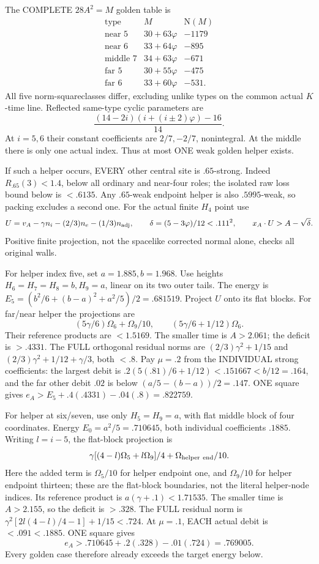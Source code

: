 \documentclass[11pt]{article}
\begin{document}
The COMPLETE \(28A^2=M\) golden table is
\[
\begin{array}{c|c|r}
 \text{type}&M&\mathrm N(M)\\ \hline
 \text{near }5&30+63\varphi&-1179\\
 \text{near }6&33+64\varphi&-895\\
 \text{middle }7&34+63\varphi&-671\\
 \text{far }5&30+55\varphi&-475\\
 \text{far }6&33+60\varphi&-531 .
\end{array}
\]
All five norm-squareclasses differ, excluding
unlike types on the common actual \(K\)-time line.
Reflected same-type cyclic parameters are
\[
                  {\frac{(14-2i)(i+(i\pm2)\varphi)-16}{14}}.
\]
At \(i=5,6\) their constant coefficients are
\(2/7,-2/7\), nonintegral.
At the middle there is only one actual index.
Thus at most ONE weak golden helper exists.

If such a helper occurs, EVERY other central
site is \(.65\)-strong.
Indeed \(R_{.65}(3)<1.4\), below all ordinary
and near-four roles; the isolated raw loss
bound below is \(<.6135\).
Any \(.65\)-weak endpoint helper is also
\(.5995\)-weak, so packing excludes a second one.
For the actual finite \(H_4\) point use
\[
 U=v_A-\gamma n_i-(2/3)n_e-(1/3)n_{\rm adj},
 \qquad\delta=(5-3\varphi)/12<.111^2,
 \qquad x_A\cdot U>A-\sqrt\delta .
\]
Positive finite projection, not the spacelike
corrected normal alone, checks all original
walls.

For helper index five, set \(a=1.885,b=1.968\).
Use heights \(H_6=H_7=H_8=b,H_9=a\), linear
on its two outer tails.
The energy is
\(E_5=(b^2/6+(b-a)^2+a^2/5)/2=.681519\).
Project \(U\) onto its flat blocks.
For far/near helper the projections are
\[
 (5\gamma/6)\Omega_6+\Omega_9/10,\qquad
 (5\gamma/6+1/12)\Omega_6 .
\]
Their reference products are \(<1.5169\).
The smaller time is \(A>2.061\); the deficit
is \(>.4331\).
The FULL orthogonal residual norms are
\((2/3)\gamma^2+1/15\) and
\((2/3)\gamma^2+1/12+\gamma/3\), both \(<.8\).
Pay \(\mu=.2\) from the INDIVIDUAL strong
coefficients: the largest debit is
\(.2(5(.81)/6+1/12)<.151667<b/12=.164\),
and the far other debit \(.02\) is below
\((a/5-(b-a))/2=.147\).
ONE square gives
\(e_A>E_5+.4(.4331)-.04(.8)=.822759\).

For helper at six/seven, use only
\(H_5=H_9=a\), with flat middle block of four
coordinates.
Energy \(E_0=a^2/5=.710645\), both individual
coefficients \(.1885\).
Writing \(l=i-5\), the flat-block projection is
\[
 \gamma[(4-l)\Omega_5+l\Omega_9]/4
                         +\Omega_{\rm helper\ end}/10 .
\]
Here the added term is \(\Omega_5/10\) for helper endpoint one,
and \(\Omega_9/10\) for helper endpoint thirteen; these are the
flat-block boundaries, not the literal helper-node indices.
Its reference product is
\(a(\gamma+.1)<1.71535\).
The smaller time is \(A>2.155\), so the
deficit is \(>.328\).
The FULL residual norm is
\(\gamma^2[2l(4-l)/4-1]+1/15<.724\).
At \(\mu=.1\), EACH actual debit is
\(<.091<.1885\).
ONE square gives
\[
                           e_A>.710645+.2(.328)-.01(.724)
                                      =.769005 .
\]
Every golden case therefore already exceeds
the target energy below.
\end{document}
